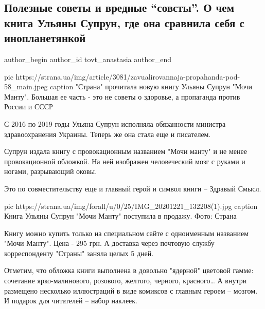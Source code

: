  
 
 
 
 
 
\subsection{Полезные советы и вредные \enquote{совєты}. О чем книга Ульяны Супрун, где она сравнила себя с инопланетянкой}
\label{sec:22_12_2020.news.ua.strana.tovt_anastasia.1.suprun_kniga_mochi_mantu}
\ifcmt
	author_begin
   author_id tovt_anastasia
	author_end
\fi

\ifcmt
pic https://strana.ua/img/article/3081/zavualirovannaja-propahanda-pod-58_main.jpeg
caption "Страна" прочитала новую книгу Ульяны Супрун "Мочи Манту". Большая ее часть - это не советы о здоровье, а пропаганда против России и СССР 
\fi

С 2016 по 2019 годы Ульяна Супрун исполняла обязанности министра
здравоохранения Украины. Теперь же она стала еще и писателем.
 
Супрун издала книгу с провокационным названием "Мочи манту" и не менее
провокационной обложкой. На ней изображен человеческий мозг с руками и ногами,
разрывающий оковы.
 
Это по совместительству еще и главный герой и символ книги – Здравый Смысл. 

\ifcmt
pic https://strana.ua/img/forall/u/0/25/IMG_20201221_132208(1).jpg
caption Книга Ульяны Супрун "Мочи Манту" поступила в продажу. Фото: Страна
\fi

Книгу можно купить только на специальном сайте с одноименным названием "Мочи
Манту". Цена - 295 грн. А доставка через почтовую службу корреспонденту
"Страны" заняла целых 5 дней. 
 
Отметим, что обложка книги выполнена в довольно "ядерной" цветовой гамме:
сочетание ярко-малинового, розового, желтого, черного, красного… А внутри
размещено несколько иллюстраций в виде комиксов с главным героем – мозгом. И
подарок для читателей – набор наклеек. 

